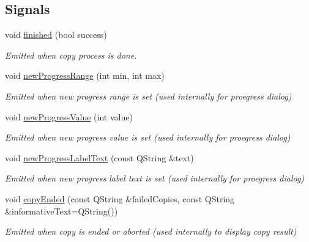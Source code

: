 \subsection*{Signals}
\begin{DoxyCompactItemize}
\item 
void \hyperlink{classmdt_file_copier_a808f01eb2a319e82a9fec5bb978ccb85}{finished} (bool success)
\begin{DoxyCompactList}\small\item\em Emitted when copy process is done. \end{DoxyCompactList}\item 
void \hyperlink{classmdt_file_copier_a4c6c815614ab929ebe36f62f09296f25}{new\-Progress\-Range} (int min, int max)
\begin{DoxyCompactList}\small\item\em Emitted when new progress range is set (used internally for proegress dialog) \end{DoxyCompactList}\item 
void \hyperlink{classmdt_file_copier_a48c337249ec54bd9f672b079fca3116f}{new\-Progress\-Value} (int value)
\begin{DoxyCompactList}\small\item\em Emitted when new progress value is set (used internally for proegress dialog) \end{DoxyCompactList}\item 
void \hyperlink{classmdt_file_copier_a70626ba282633b15d2bdb398081c71be}{new\-Progress\-Label\-Text} (const Q\-String \&text)
\begin{DoxyCompactList}\small\item\em Emitted when new progress label text is set (used internally for proegress dialog) \end{DoxyCompactList}\item 
void \hyperlink{classmdt_file_copier_aad51a259e0e55a67698d599e43dc1264}{copy\-Ended} (const Q\-String \&failed\-Copies, const Q\-String \&informative\-Text=Q\-String())
\begin{DoxyCompactList}\small\item\em Emitted when copy is ended or aborted (used internally to display copy result) \end{DoxyCompactList}\end{DoxyCompactItemize}
